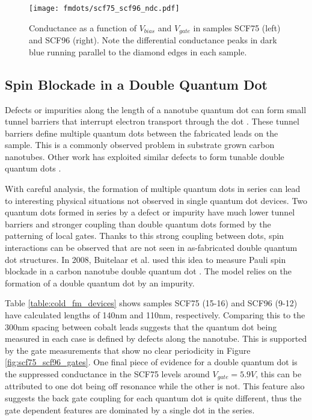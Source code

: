 \begin{figure}
    \centering
    \texttt{[image: fmdots/scf75\_scf96\_ndc.pdf]}
    \caption{Conductance as a function of $V_{bias}$ and $V_{gate}$ in samples SCF75 (left) and SCF96 (right). Note the differential conductance peaks in dark blue running parallel to the diamond edges in each sample.}
    \label{fig:negative_differential_conductance}
\end{figure}

\subsection{Spin Blockade in a Double Quantum Dot}
\label{sec:dqd_model}

Defects or impurities along the length of a nanotube quantum dot can form small tunnel barriers that interrupt electron transport through the dot \cite{McEuen1999, Bockrath2001}. These tunnel barriers define multiple quantum dots between the fabricated leads on the sample. This is a commonly observed problem in substrate grown carbon nanotubes. Other work has exploited similar defects to form tunable double quantum dots \cite{Mason2004, Jorgensen2007}.

With careful analysis, the formation of multiple quantum dots in series can lead to interesting physical situations not observed in single quantum dot devices. Two quantum dots formed in series by a defect or impurity have much lower tunnel barriers and stronger coupling than double quantum dots formed by the patterning of local gates. Thanks to this strong coupling between dots, spin interactions can be observed that are not seen in as-fabricated double quantum dot structures. In 2008, Buitelaar et al. used this idea to measure Pauli spin blockade in a carbon nanotube double quantum dot \cite{Buitelaar2008}. The model relies on the formation of a double quantum dot by an impurity.

Table \ref{table:cold_fm_devices} shows samples SCF75 (15-16) and SCF96 (9-12) have calculated lengths of 140nm and 110nm, respectively. Comparing this to the 300nm spacing between cobalt leads suggests that the quantum dot being measured in each case is defined by defects along the nanotube. This is supported by the gate measurements that show no clear periodicity in Figure \ref{fig:scf75_scf96_gates}. One final piece of evidence for a double quantum dot is the suppressed conductance in the SCF75 levels around $V_{gate}=5.9V$, this can be attributed to one dot being off resonance while the other is not. This feature also suggests the back gate coupling for each quantum dot is quite different, thus the gate dependent features are dominated by a single dot in the series.

